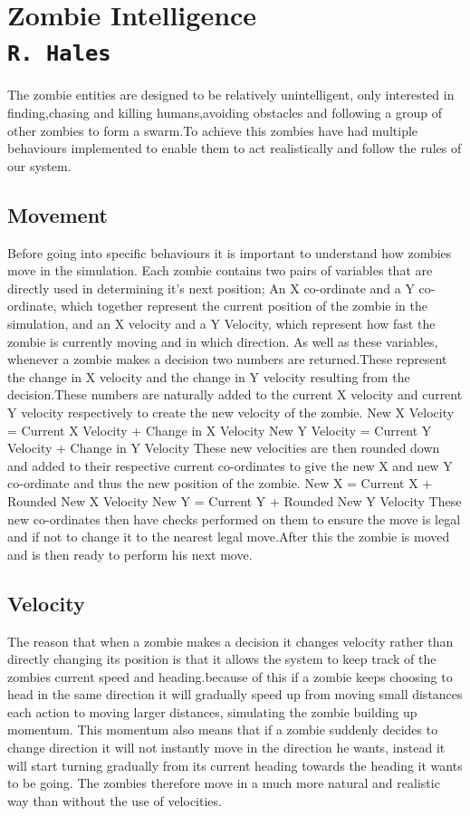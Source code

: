 \pagestyle{empty}
\section{Zombie Intelligence\\{\small\tt{R.~Hales}}}
\label{zombie_doc}
The zombie entities are designed to be relatively unintelligent, only interested in finding,chasing and killing humans,avoiding obstacles and following a group of other zombies to form a swarm.To achieve this zombies have had multiple behaviours implemented to enable them to act realistically and follow the rules of our system.
\subsection{Movement}
Before going into specific behaviours it is important to understand how zombies move in the simulation. Each zombie contains two pairs of variables that are directly used in determining it's next position; An X co-ordinate and a Y co-ordinate, which together represent the current position of the zombie in the simulation, and an X velocity and a Y Velocity, which represent how fast the zombie is currently moving and in which direction.
As well as these variables, whenever a zombie makes a decision two numbers are returned.These represent the change in X velocity and the change in Y velocity resulting from the decision.These numbers are naturally added to the current X velocity and current Y velocity respectively to create the new velocity of the zombie.
	New X Velocity = Current X Velocity + Change in X Velocity
	New Y Velocity = Current Y Velocity + Change in Y Velocity
These new velocities are then rounded down and added to their respective current co-ordinates to give the new X and new Y co-ordinate and thus the new position of the zombie.
	New X = Current X + Rounded New X Velocity
	New Y = Current Y + Rounded New Y Velocity
These new co-ordinates then have checks performed on them to ensure the move is legal and if not to change it to the nearest legal move.After this the zombie is moved and is then ready to perform his next move.
\subsection{Velocity} 
The reason that when a zombie makes a decision it changes velocity rather than directly changing its position is that it allows the system to keep track of the zombies current speed and heading.because of this if a zombie keeps choosing to head in the same direction it will gradually speed up from moving small distances each action to moving larger distances, simulating the zombie building up momentum. This momentum also means that if a zombie suddenly decides to change direction it will not instantly move in the direction he wants, instead it will start turning gradually from its current heading towards the heading it wants to be going. The zombies therefore move in a much more natural and realistic way than without the use of velocities.

